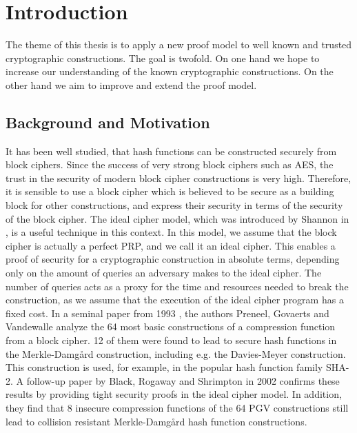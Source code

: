 \chapter{Introduction}
\renewcommand{\MD}{Merkle-Damg\aa rd }
 
The theme of this thesis is to apply a new proof model to well known and trusted cryptographic constructions.
The goal is twofold.
On one hand we hope to increase our understanding of the known cryptographic constructions.
On the other hand we aim to improve and extend the proof model.

\section{Background and Motivation}

It has been well studied, that hash functions can be constructed securely from block ciphers.
Since the success of very strong block ciphers such as AES, 
the trust in the security of modern block cipher constructions is very high.
Therefore, it is sensible to use a block cipher which is believed to be secure as a building block for other constructions,
and express their security in terms of the security of the block cipher.
The ideal cipher model, which was introduced by Shannon in \cite{Shannon49},
is a useful technique in this context.
In this model, we assume that the block cipher is actually a perfect PRP, and we call it an ideal cipher.
This enables a proof of security for a cryptographic construction in absolute terms,
depending only on the amount of queries an adversary makes to the ideal cipher.
The number of queries acts as a proxy for the time and resources needed to break the construction,
as we assume that the execution of the ideal cipher program has a fixed cost.
In a seminal paper from 1993 \cite{C:PreGovVan93}, the authors Preneel, Govaerts and Vandewalle analyze the 64 most basic constructions of a compression function from a block cipher.
12 of them were found to lead to secure hash functions in the \MD construction, including e.g. the Davies-Meyer construction.
This construction is used, for example, in the popular hash function family SHA-2.
A follow-up paper by Black, Rogaway and Shrimpton \cite{C:BlaRogShr02} in 2002 confirms these results
by providing tight security proofs in the ideal cipher model.
In addition, 
they find that 8 insecure compression functions of the 64 PGV constructions still lead to collision resistant \MD hash function constructions.

